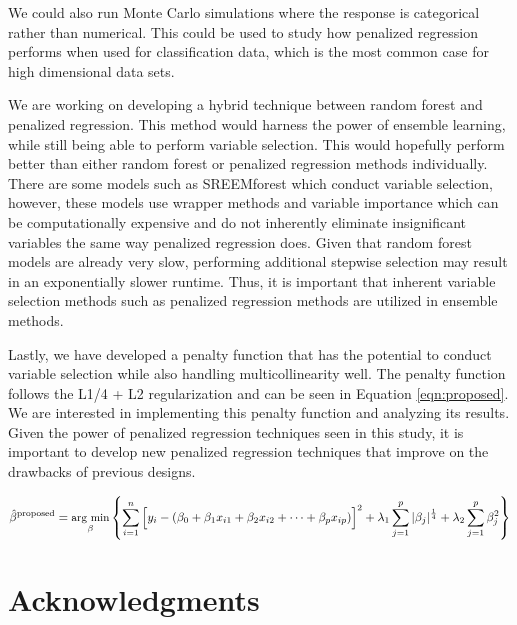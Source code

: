 \documentclass{article}
\newcommand{\argmin}[2]{\underset{#1}{\text{arg min}}\left\{#2\right\}}
\begin{document}
	We could also run Monte Carlo simulations where the response is categorical rather than numerical. This could be used to study how penalized regression performs when used for classification data, which is the most common case for high dimensional data sets.
	
	We are working on developing a hybrid technique between random forest and penalized regression. This method would harness the power of ensemble learning, while still being able to perform variable selection. This would hopefully perform better than either random forest or penalized regression methods individually. There are some models such as SREEMforest \cite{capitaine2021random} which conduct variable selection, however, these models use wrapper methods and variable importance which can be computationally expensive and do not inherently eliminate insignificant variables the same way penalized regression does. Given that random forest models are already very slow, performing additional stepwise selection may result in an exponentially slower runtime. Thus, it is important that inherent variable selection methods such as penalized regression methods are utilized in ensemble methods.
	
	Lastly, we have developed a penalty function that has the potential to conduct variable selection while also handling multicollinearity well. The penalty function follows the L1/4 + L2 regularization and can be seen in Equation \ref{eqn:proposed}. We are interested in implementing this penalty function and analyzing its results. Given the power of penalized regression techniques seen in this study, it is important to develop new penalized regression techniques that improve on the drawbacks of previous designs.
	
	\begin{equation}
		\label{eqn:proposed}
		\small
		\hat{\beta}^{\text{proposed}} = \argmin{\beta}{\sum\limits_{i = 1}^n \Big[y_i - (\beta_0 + \beta_1 x_{i1} + \beta_2 x_{i2} + \cdots + \beta_p x_{ip})\Big]^2  + \lambda_1\sum\limits_{j = 1}^p \vert \beta_j \vert^{\frac{1}{4}} + \lambda_2\sum\limits_{j = 1}^p \beta_j^2}
	\end{equation}
	
	\newpage
	\section{Acknowledgments}
	
\end{document}

